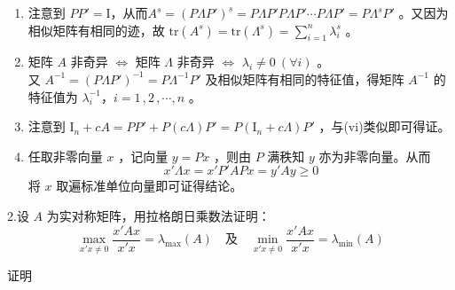 \documentclass[12pt,hyperref,]{ctexart}
\begin{document}
\begin{enumerate}
\item
  注意到
  \(PP'=\mathrm{I}\)，从而\(A^s=(P\Lambda P')^s=P\Lambda P'P\Lambda P'\cdots P\Lambda P'=P\Lambda^s P'\)
  。又因为相似矩阵有相同的迹，故
  \(\mathrm{tr}(A^s)=\mathrm{tr}(\Lambda^s)=\sum_{i=1}^{n}\lambda_i^s\)
  。
\item
  矩阵 \(A\) 非奇异 \(\Leftrightarrow\) 矩阵 \(\Lambda\) 非奇异
  \(\Leftrightarrow\) \(\lambda_i \ne 0\ (\forall i)\) 。\\
  又 \(A^{-1}=(P\Lambda P')^{-1}=P\Lambda^{-1} P'\)
  及相似矩阵有相同的特征值，得矩阵 \(A^{-1}\) 的特征值为
  \(\lambda_i^{-1}\text{，}i=1\, ,2\, ,\cdots ,n\) 。
\item
  注意到
  \(\mathrm{I}_n+cA=PP'+P(c\Lambda)P'=P(\mathrm{I}_n+c\Lambda)P'\)
  ，与(vi)类似即可得证。
\item
  任取非零向量 \(x\) ，记向量 \(y=Px\) ，则由 \(P\) 满秩知 \(y\)
  亦为非零向量。从而 \begin{equation*}
  x'\Lambda x=x'P'APx=y'Ay \ge 0
  \end{equation*}将 \(x\) 取遍标准单位向量即可证得结论。
\end{enumerate}

\vspace{3em}

\kaishu

2.设 \(A\) 为实对称矩阵，用拉格朗日乘数法证明： \begin{equation*}
\max_{x'x \ne 0} \frac{x'Ax}{x'x} = \lambda_{\max}(A)\quad \text{及} \quad \min_{x'x \ne 0} \frac{x'Ax}{x'x} = \lambda_{\min}(A)
\end{equation*} \vspace{1em}

\heiti

证明

\songti
\end{document}
